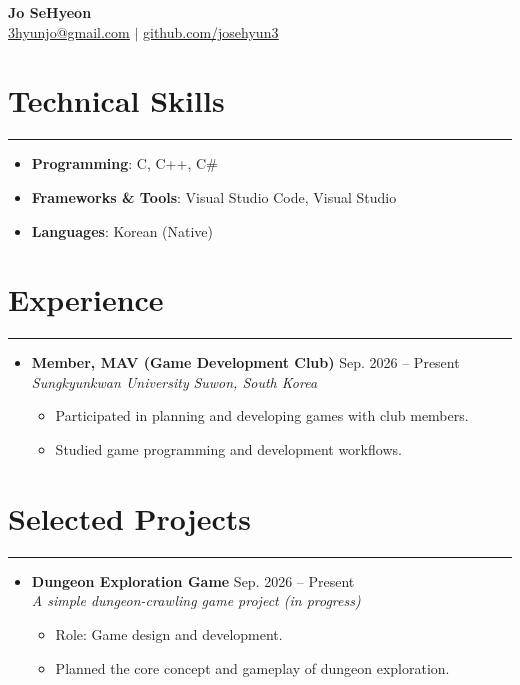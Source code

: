 \documentclass[letterpaper, 10pt]{article}
\begin{document}
\begin{center}
   \textbf{\LARGE Jo SeHyeon} \\ \vspace{2pt}
   \href{mailto:3hyunjo@gmail.com}{\underline{3hyunjo@gmail.com}} $|$
   \href{https://github.com/josehyun3}{\underline{github.com/josehyun3}}
\end{center}

\section*{Technical Skills}
\hrule
\vspace{4pt}
\begin{itemize}
  \item[] \textbf{Programming}: C, C++, C\#
  \item[] \textbf{Frameworks \& Tools}: Visual Studio Code, Visual Studio
  \item[] \textbf{Languages}: Korean (Native)
\end{itemize}

\section*{Experience}
\hrule
\vspace{4pt}
\begin{itemize}
   \item[]
       \textbf{Member, MAV (Game Development Club)} \hfill Sep. 2026 -- Present \\
       \textit{Sungkyunkwan University} \hfill \textit{Suwon, South Korea}
       \begin{itemize}
           \item Participated in planning and developing games with club members.
           \item Studied game programming and development workflows.
       \end{itemize}
\end{itemize}

\section*{Selected Projects}
\hrule
\vspace{4pt}
\begin{itemize}
   \item[]
       \textbf{Dungeon Exploration Game} \hfill Sep. 2026 -- Present \\
       \textit{A simple dungeon-crawling game project (in progress)}
       \begin{itemize}
           \item Role: Game design and development.
           \item Planned the core concept and gameplay of dungeon exploration.
       \end{itemize}
\end{itemize}
\end{document}

